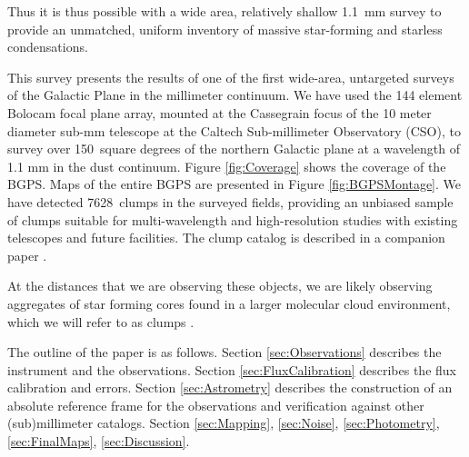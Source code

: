\documentclass[12pt,preprint]{aastex}
\def\bgps{BGPS}
\newcommand{\bgpsarea}{150}
\newcommand{\ncores}{7628}
\begin{document}
Thus it is thus possible with a wide area, relatively shallow 1.1~mm
survey to provide an unmatched, uniform inventory of massive
star-forming and starless condensations.

This survey presents the results of one of the first wide-area,
untargeted surveys of the Galactic Plane in the millimeter continuum.
We have used the 144 element Bolocam focal plane array, mounted at the
Cassegrain focus of the 10 meter diameter sub-mm telescope at the
Caltech Sub-millimeter Observatory (CSO), to survey over \bgpsarea\
square degrees of the northern Galactic plane at a wavelength of 1.1
mm in the dust continuum.  Figure \ref{fig:Coverage} shows the
coverage of the \bgps.  Maps of the entire BGPS are presented in
Figure \ref{fig:BGPSMontage}.  We have detected \ncores\ clumps in the
surveyed fields, providing an unbiased sample of clumps suitable for
multi-wavelength and high-resolution studies with existing telescopes
and future facilities.  The clump catalog is described in a companion
paper \citep{rosolowsky09}.

At the distances that we are observing these objects, we are likely
observing aggregates of star forming cores found in a larger molecular
cloud environment, which we will refer to as clumps
\citep{williams00}.


The outline of the paper is as follows. Section \ref{sec:Observations}
describes the instrument and the observations.  Section
\ref{sec:FluxCalibration} describes the flux calibration and errors.
Section \ref{sec:Astrometry} describes the construction of an absolute
reference frame for the observations and verification against other
(sub)millimeter catalogs.  Section \ref{sec:Mapping}, \ref{sec:Noise},
\ref{sec:Photometry}, \ref{sec:FinalMaps}, \ref{sec:Discussion}.

\end{document}
